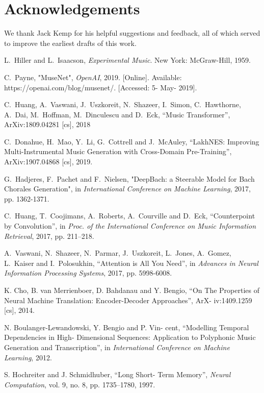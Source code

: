 \documentclass{article}
\begin{document}
\section{Acknowledgements}\label{sec:ack}

We thank Jack Kemp for his helpful suggestions and feedback, all of which served to improve the earliest drafts of this work.

\begin{thebibliography}{citations}
L.~Hiller and L.~Isaacson, {\em Experimental Music}. New York: McGraw-Hill, 1959.

C.~Payne, "MuseNet", {\em OpenAI}, 2019. [Online]. Available: https://openai.com/blog/musenet/. [Accessed: 5- May- 2019].

 C.~Huang, A.~Vaswani, J.~Uszkoreit, N.~Shazeer, I.~Simon, C.~Hawthorne, A.~Dai, M.~Hoffman, M.~Dinculescu and D.~Eck, “Music Transformer”, ArXiv:1809.04281 [cs], 2018

C.~Donahue, H.~Mao, Y.~Li, G.~Cottrell and J.~McAuley, “LakhNES: Improving Multi-Instrumental Music Generation with Cross-Domain Pre-Training”, ArXiv:1907.04868 [cs], 2019.

G.~Hadjeres, F.~Pachet and F.~Nielsen, "DeepBach: a Steerable Model for Bach Chorales Generation", in  {\em International Conference on Machine Learning}, 2017, pp. 1362-1371.

C.~Huang, T.~Coojimans, A.~Roberts, A.~Courville and D.~Eck, “Counterpoint by Convolution”, in {\em Proc. of the International Conference on Music Information Retrieval}, 2017, pp. 211–218.

A.~Vaswani, N.~Shazeer, N.~Parmar, J.~Uszkoreit, L.~Jones, A.~Gomez, L.~Kaiser and I.~Polosukhin, “Attention is All You Need”, in {\em Advances in Neural Information Processing Systems}, 2017, pp. 5998-6008.

K. Cho, B. van Merrienboer, D. Bahdanau and Y. Bengio, “On The Properties of Neural Machine Translation: Encoder-Decoder Approaches”, ArX- iv:1409.1259 [cs], 2014.

N. Boulanger-Lewandowski, Y. Bengio and P. Vin- cent, “Modelling Temporal Dependencies in High- Dimensional Sequences: Application to Polyphonic Music Generation and Transcription”, in {\em International Conference on Machine Learning}, 2012.

S. Hochreiter and J. Schmidhuber, “Long Short- Term Memory”, {\em Neural Computation}, vol. 9, no. 8, pp. 1735–1780, 1997.


\end{thebibliography}
\end{document}
